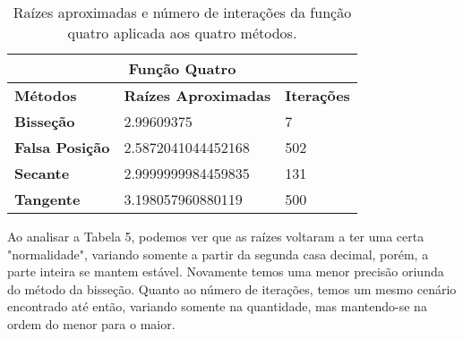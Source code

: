 \documentclass[12pt]{article}
\begin{document}
\begin{table}[!h]
\begin{center}
\begin{tabular}{lll}
\multicolumn{3}{c}{\textbf{Função Quatro}}                                                                          \\ \hline
\multicolumn{1}{l|}{\textbf{Métodos}}       & \multicolumn{1}{l|}{\textbf{Raízes Aproximadas}} & \textbf{Iterações} \\ \hline
\multicolumn{1}{l|}{\textbf{Bisseção}}      & \multicolumn{1}{l|}{2.99609375}                  & 7                  \\ \hline
\multicolumn{1}{l|}{\textbf{Falsa Posição}} & \multicolumn{1}{l|}{2.5872041044452168}          & 502                \\ \hline
\multicolumn{1}{l|}{\textbf{Secante}}       & \multicolumn{1}{l|}{2.9999999984459835}          & 131                \\ \hline
\multicolumn{1}{l|}{\textbf{Tangente}}      & \multicolumn{1}{l|}{3.198057960880119}           & 500               
\end{tabular}
    \caption{Raízes aproximadas e número de interações da função quatro aplicada aos quatro métodos.}
\end{center}
\end{table}

Ao analisar a Tabela 5, podemos ver que as raízes voltaram a ter uma certa "normalidade", variando somente a partir da segunda casa decimal, porém, a parte inteira se mantem estável. Novamente temos uma menor precisão oriunda do método da bisseção. Quanto ao número de iterações, temos um mesmo cenário encontrado até então, variando somente na quantidade, mas mantendo-se na ordem do menor para o maior.
\end{document}
